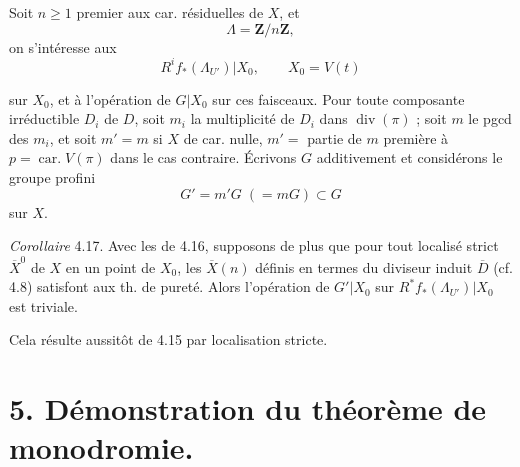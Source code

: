 \documentclass[11pt,a4paper]{article}
\begin{document}

Soit $n \geqslant 1$ premier aux car. résiduelles de $X$, et 
\[
\Lambda = \mathbf{Z}/n\mathbf{Z} ,
\]
on s'intéresse aux 
\[
R^i f_*(\Lambda_{U'})|X_0 , \qquad X_0 = V(t)
\]


sur $X_0$, et à l'opération de $G|X_0$ sur ces faisceaux. Pour toute composante irréductible $D_i$ de $D$, soit $m_i$ la multiplicité de \struck{\ill{}} $D_i$ dans $\operatorname{div}(\pi)$ ; soit $m$ le pgcd des $m_i$, et soit $m' = m$ si $X$ de car. nulle, $m' =$ partie de $m$ première à $p = \operatorname{car.} V(\pi)$ dans le cas contraire.
Écrivons $G$ additivement et considérons le groupe profini
\[
G' = m'G \;(= mG) \subset G
\]
sur $X$. \struck{\ill{}}

\emph{Corollaire} 4.17. Avec les   de 4.16, supposons de plus que pour tout localisé strict $\overline{X}^0$ de $X$ en un point de $X_0$, les $\overline{X}(n)$ définis en termes du diviseur induit $\overline{D}$ (cf. 4.8) satisfont aux th. de pureté. Alors l'opération de $G'|X_0$ sur \struck{\ill{}} $R^*f_*(\Lambda_{U'})|X_0$ est triviale.

Cela résulte aussitôt de 4.15 par localisation stricte.

        


\section*{5. Démonstration du théorème de monodromie.}
\end{document}
